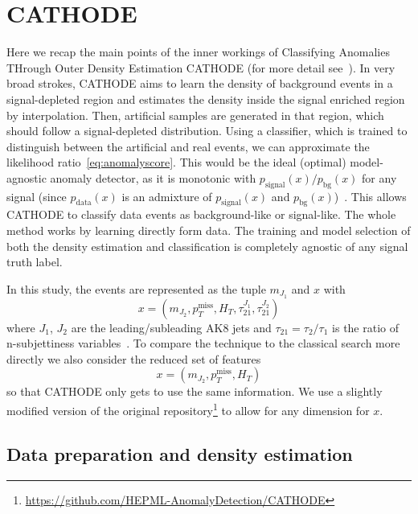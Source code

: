 \documentclass[prd, twocolumn, superscriptaddress,floatfix, nofootinbib, preprintnumbers]{revtex4-2}
\begin{document}
\section{CATHODE}
\label{sec:CATHODE}

Here we recap the main points of the inner workings of Classifying Anomalies THrough Outer Density Estimation CATHODE (for more detail see~\cite{Hallin:2021wme}). In very broad strokes, CATHODE aims to learn the density of background events in a signal-depleted region and estimates the density inside the signal enriched region by interpolation. Then, artificial samples are generated in that region, which should follow a signal-depleted distribution.  Using a classifier, which is trained to distinguish between the artificial and real events, we can approximate the likelihood ratio~\eqref{eq:anomalyscore}.
This would be the ideal (optimal) model-agnostic anomaly detector, as it is monotonic with $p_\text{signal}(x) / p_\text{bg}(x)$ for any signal (since $p_\text{data}(x)$ is an admixture of $p_\text{signal}(x)$ and $ p_\text{bg}(x)$)~\cite{Metodiev:2017vrx}.
This allows CATHODE to classify data events as background-like or signal-like. The whole method works by learning directly form data. The training and model selection of both the density estimation and classification is completely agnostic of any signal truth label.



In this study, the events are represented as the tuple $m_{J_1}$ and $x$ with 
\begin{equation}\label{eq:fivedfeatures}
x=\left(m_{J_2}, p_T^\text{miss},H_T, \tau_{21}^{J_1},\tau_{21}^{J_2}\right)
\end{equation} where $J_1$, $J_2$ are the leading/subleading AK8 jets and $\tau_{21}=\tau_2 / \tau_1$ is the ratio of n-subjettiness variables~\cite{Thaler:2010tr}.
To compare the technique to the classical search more directly we also consider the reduced set of features 
\begin{equation}\label{eq:threedfeatures}
x=\left(m_{J_2}, p_T^\text{miss},H_T\right)
\end{equation}
so that CATHODE only gets to use the same information.
We use a slightly modified version of the original repository\footnote{\url{https://github.com/HEPML-AnomalyDetection/CATHODE}} to allow for any dimension for $x$. 

\subsection{Data preparation and density estimation}
\end{document}
